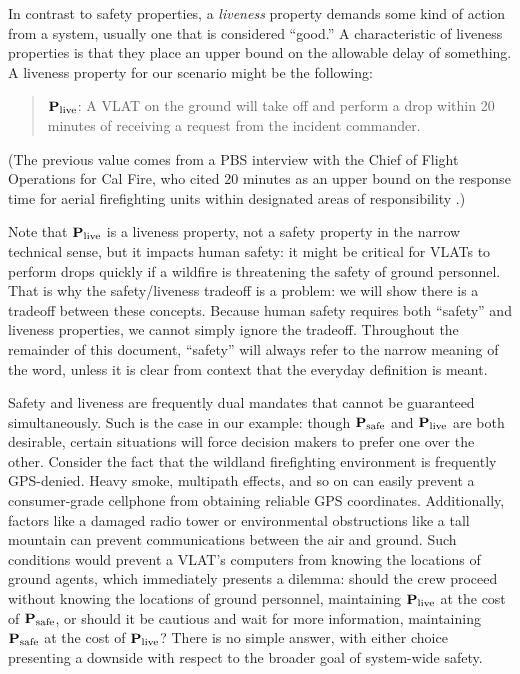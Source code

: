 \documentclass[]             %
{NASA}                       %
\theoremstyle{definition}
\begin{document}
In contrast to safety properties, a \emph{liveness} property demands some kind of action
from a system, usually one that is considered ``good.'' A
characteristic of liveness properties is that they place an upper
bound on the allowable delay of something. A liveness
property for our scenario might be the following:
\begin{quote}
  $\textbf{P}_\textrm{live}$: A VLAT on the ground will take off and
  perform a drop within 20 minutes of receiving a request from the
  incident commander.
\end{quote}
(The previous value comes from a PBS interview with the Chief of Flight Operations for Cal
    Fire, who cited 20 minutes as an upper bound on the response time for
    aerial firefighting units within designated areas of responsibility \cite{2021:aerialfirefighting}.)

Note that $\textbf{P}_\textrm{live}$
is a liveness property, not a safety property in the narrow technical
sense, but it impacts human safety: it might be critical for VLATs to
perform drops quickly if a wildfire is threatening the safety of
ground personnel. That is why the safety/liveness tradeoff is a problem: we will show there is a tradeoff between these concepts. Because human safety requires both ``safety'' and liveness properties, we cannot simply ignore the tradeoff. Throughout the remainder of this document, ``safety'' will always refer to the narrow meaning of the word, unless it is clear from context that the everyday definition is meant.

Safety and liveness are frequently dual mandates that cannot be
guaranteed simultaneously. Such is the case in our example: though
$\textbf{P}_\textrm{safe}$ and $\textbf{P}_\textrm{live}$ are both desirable, certain situations will
force decision makers to prefer one over the other. Consider the fact
that the wildland firefighting environment is frequently GPS-denied.
Heavy smoke, multipath effects, and so on can easily prevent a
consumer-grade cellphone from obtaining reliable GPS
coordinates. Additionally, factors like a damaged radio tower or
environmental obstructions like a tall mountain can prevent
communications between the air and ground. Such conditions would
prevent a VLAT's computers from knowing the locations of ground
agents, which immediately presents a dilemma: should the crew proceed
without knowing the locations of ground personnel, maintaining
$\textbf{P}_\textrm{live}$ at the cost of $\textbf{P}_\textrm{safe}$, or should it be cautious and wait
for more information, maintaining $\textbf{P}_\textrm{safe}$ at the cost of $\textbf{P}_\textrm{live}$?
There is no simple answer, with either choice presenting a downside
with respect to the broader goal of system-wide safety.
\end{document}
